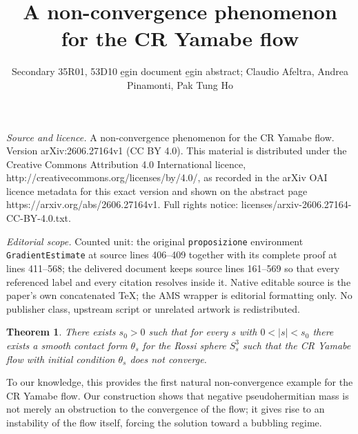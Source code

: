 \documentclass[10pt,a4paper]{amsart}
\newtheorem{teorema}[proposizione]{Theorem}
\begin{document}
\title[A non-convergence phenomenon for the CR Yamabe flow]{A non-convergence phenomenon for the CR Yamabe flow}
\author{Secondary 35R01, 53D10 e̱gin document e̱gin abstract; Claudio Afeltra, Andrea Pinamonti, Pak Tung Ho}
\date{}
\maketitle
\noindent\emph{Source and licence.} A non-convergence phenomenon for the CR Yamabe flow. Version arXiv:2606.27164v1 (CC BY 4.0). This material is distributed under the Creative Commons Attribution 4.0 International licence, http://creativecommons.org/licenses/by/4.0/, as recorded in the arXiv OAI licence metadata for this exact version and shown on the abstract page https://arxiv.org/abs/2606.27164v1. Full rights notice: licenses/arxiv-2606.27164-CC-BY-4.0.txt.\par\smallskip
\noindent\textit{Editorial scope.} Counted unit: the original \texttt{proposizione} environment \texttt{GradientEstimate} at source lines 406--409 together with its complete proof at lines 411--568; the delivered document keeps source lines 161--569 so that every referenced label and every citation resolves inside it. Native editable source is the paper's own concatenated TeX; the AMS wrapper is editorial formatting only. No publisher class, upstream script or unrelated artwork is redistributed.
\begin{teorema}\label{MainTheorem}
 There exists $s_0>0$ such that for every $s$ with $0<|s|<s_0$ there exists a smooth contact form $\theta_s$ for the Rossi sphere $S^3_s$ such that the CR Yamabe flow with initial condition $\theta_s$ does not converge.
\end{teorema}
To our knowledge, this provides the first natural non-convergence
example for the CR Yamabe flow. Our construction shows that negative
pseudohermitian mass is not merely an obstruction to the convergence of the flow; it gives rise to an instability of the flow
itself, forcing the solution toward a bubbling regime.
\end{document}
